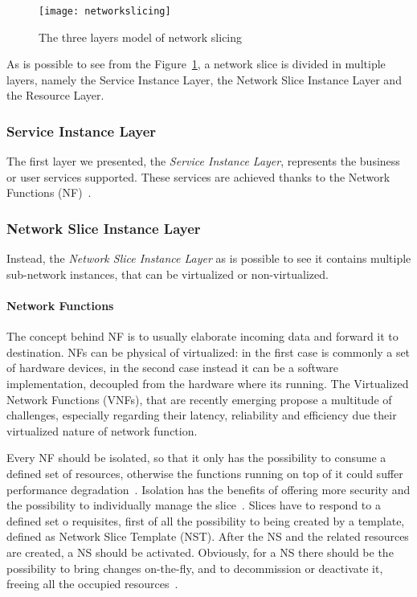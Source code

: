 \begin{figure}[t]
  \centering
  \texttt{[image: networkslicing]}
  \caption[The three layers model of network slicing]{The three layers model of
    network slicing~\cite{alliance2016description}}
  \label{chap:background:img:network_slicing}
\end{figure}

As is possible to see from the Figure~\ref{chap:background:img:network_slicing},
a network slice is divided in multiple layers, namely the Service Instance
Layer, the Network Slice Instance Layer and the Resource Layer.

\subsubsection{Service Instance Layer}
The first layer we presented, the \emph{Service Instance Layer}, represents the
business or user services supported. These services are achieved thanks to the
Network Functions (NF)~\cite{kotulski2017end}.

\subsubsection{Network Slice Instance Layer}
Instead, the \emph{Network Slice Instance Layer} as is possible to see it
contains multiple sub-network instances, that can be virtualized or
non-virtualized.

\paragraph*{Network Functions}
The concept behind NF is to usually elaborate incoming data and forward it to
destination. NFs can be physical of virtualized: in the first case is commonly a
set of hardware devices, in the second case instead it can be a software
implementation, decoupled from the hardware where its running. The Virtualized
Network Functions (VNFs), that are recently emerging propose a multitude of
challenges, especially regarding their latency, reliability and efficiency due
their virtualized nature of network function.

\vspace{0.5cm}

\noindent Every NF should be isolated, so that it only has the possibility to
consume a defined set of resources, otherwise the functions running on top of it
could suffer performance degradation~\cite{richart2016resource}. Isolation has
the benefits of offering more security and the possibility to individually
manage the slice~\cite{ordonez2017network}. Slices have to respond to a defined
set o requisites, first of all the possibility to being created by a template,
defined as Network Slice Template (NST). After the NS and the related resources
are created, a NS should be activated. Obviously, for a NS there should be the
possibility to bring changes on-the-fly, and to decommission or deactivate it,
freeing all the occupied resources~\cite{slice20183gpp}.

